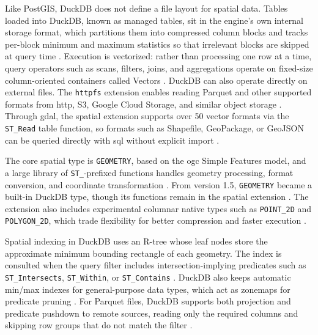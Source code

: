 Like PostGIS, DuckDB does not define a file layout for spatial data. Tables loaded into DuckDB, known as managed tables, sit in the engine's own internal storage format, which partitions them into compressed column blocks and tracks per-block minimum and maximum statistics so that irrelevant blocks are skipped at query time \parencite{raasveldt2019_duckdb_embeddable_analytical_database}. Execution is vectorized: rather than processing one row at a time, query operators such as scans, filters, joins, and aggregations operate on fixed-size column-oriented containers called Vectors \parencite{duckdb2025_vector}. DuckDB can also operate directly on external files. The \texttt{httpfs} extension enables reading Parquet and other supported formats from \acrshort{http}, S3, Google Cloud Storage, and similar object storage \parencite{duckdb2025_documentation_httpfs}. Through \acrshort{gdal}, the spatial extension supports over \num{50} vector formats via the \texttt{ST\_Read} table function, so formats such as Shapefile, GeoPackage, or GeoJSON can be queried directly with \acrshort{sql} without explicit import \parencite{gabrielsson2023_postgeese_duckdb_spatial_extension}.

The core spatial type is \texttt{GEOMETRY}, based on the \acrshort{ogc} Simple Features model, and a large library of \texttt{ST\_}-prefixed functions handles geometry processing, format conversion, and coordinate transformation \parencite{gabrielsson2023_postgeese_duckdb_spatial_extension, duckdb2025_spatial_extension_overview}. From version 1.5, \texttt{GEOMETRY} became a built-in DuckDB type, though its functions remain in the spatial extension \parencite{duckdb2025_spatial_extension_overview}. The extension also includes experimental columnar native types such as \texttt{POINT\_2D} and \texttt{POLYGON\_2D}, which trade flexibility for better compression and faster execution \parencite{gabrielsson2023_postgeese_duckdb_spatial_extension, duckdb2025_spatial_extension_overview}.

{\sloppy
Spatial indexing in DuckDB uses an R-tree whose leaf nodes store the approximate minimum bounding rectangle of each geometry. The index is consulted when the query filter includes intersection-implying predicates such as \texttt{ST\_Intersects}, \texttt{ST\_Within}, or \texttt{ST\_Contains} \parencite{duckdb2025_spatial_extension_rtree_indexes}. DuckDB also keeps automatic min/max indexes for general-purpose data types, which act as zonemaps for predicate pruning \parencite{duckdb2025_documentation_indexes}. For Parquet files, DuckDB supports both projection and predicate pushdown to remote sources, reading only the required columns and skipping row groups that do not match the filter \parencite{duckdb2025_parquet_overview, duckdb2025_documentation_httpfs}.
\par}


